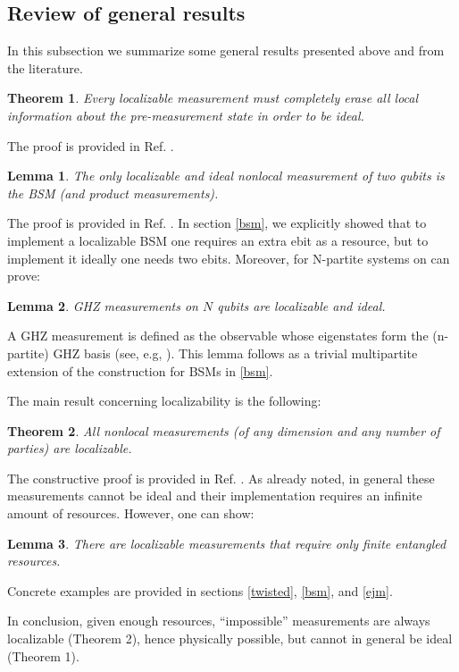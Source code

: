 \documentclass[a4paper,twocolumn,11pt,accepted=2024-02-14]{quantumarticle}
\newtheorem{theorem}{Theorem}
\newtheorem{lemma}{Lemma}
\begin{document}
\subsection{Review of general results}
\label{general}
In this subsection we summarize some general results presented above and from the literature.
\begin{theorem}
Every localizable measurement must completely erase all local information  about the pre-measurement state in order to be ideal.
\end{theorem}
\noindent The proof is provided in Ref. \cite{popescu1994causality}.
\begin{lemma}
        The only localizable and ideal nonlocal measurement of two qubits is the BSM (and product measurements).
\end{lemma}
\noindent The proof is provided in Ref. \cite{popescu1994causality}. In section \ref{bsm}, we explicitly showed that to implement a localizable BSM one requires an extra ebit as a resource, but to implement it ideally one needs two ebits. Moreover, for N-partite systems on can prove:
\begin{lemma}
        GHZ measurements on $N$ qubits are localizable and ideal.
        \end{lemma}
\noindent A GHZ measurement is defined as the observable whose eigenstates form the (n-partite) GHZ basis (see, e.g, \cite{de2020protocols}).
This lemma follows as a trivial multipartite extension of the construction for BSMs in \ref{bsm}.

The main result concerning localizability is the following:
\begin{theorem}
        All nonlocal measurements (of any dimension and any number of parties) are localizable.
\end{theorem}
\noindent The constructive proof is provided in Ref. \cite{vaidman2003instantaneous}. As already noted, in general these measurements cannot be ideal and their implementation  requires an infinite amount of resources. However, one can show:
\begin{lemma}
    There are localizable measurements that require only finite entangled resources.
\end{lemma}
\noindent Concrete examples are provided in sections \ref{twisted}, \ref{bsm}, and \ref{ejm}.

In conclusion, given enough resources, “impossible” measurements are always localizable (Theorem 2), hence physically possible, but cannot in general be ideal (Theorem 1).
\end{document}
